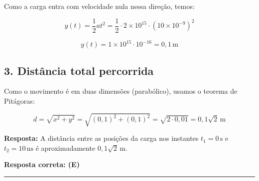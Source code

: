 \documentclass[a4paper,12pt]{article}
\begin{document}
\begin{flushleft}
Como a carga entra com velocidade nula nessa direção, temos:

\[
y(t) = \frac{1}{2} a t^2 = \frac{1}{2} \cdot 2 \times 10^{15} \cdot (10 \times 10^{-9})^2
\]

\[
y(t) = 1 \times 10^{15} \cdot 10^{-16} = 0{,}1 \, \text{m}
\]

\subsection*{3. Distância total percorrida}

Como o movimento é em duas dimensões (parabólico), usamos o teorema de Pitágoras:

\[
d = \sqrt{x^2 + y^2} = \sqrt{(0{,}1)^2 + (0{,}1)^2} = \sqrt{2 \cdot 0{,}01} = 0{,}1\sqrt{2} \, \text{m}
\]

\textbf{Resposta:} A distância entre as posições da carga nos instantes \( t_1 = 0 \, \text{s} \) e \( t_2 = 10 \, \text{ns} \) 
é aproximadamente \( \boxed{ 0{,}1\sqrt{2} \, \text{m}} \).

\textbf{Resposta correta: \colorbox{green!50}{(E)}}

\end{flushleft}

\noindent\rule{\linewidth}{0.6pt}\\
\end{document}
